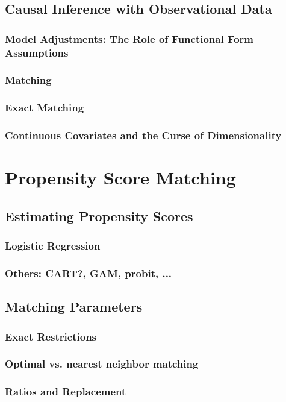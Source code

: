 \documentclass[11pt,titlepage]{article}
\begin{document}
\subsection{Causal Inference with Observational Data}
\subsubsection{Model Adjustments: The Role of Functional Form Assumptions}
\subsubsection{Matching}
\subsubsection{Exact Matching}
\subsubsection{Continuous Covariates and the Curse of Dimensionality}
\section{Propensity Score Matching}
\subsection{Estimating Propensity Scores}
\subsubsection{Logistic Regression}
\subsubsection{Others: CART?, GAM, probit, ...}
\subsection{Matching Parameters}
\subsubsection{Exact Restrictions}
\subsubsection{Optimal vs. nearest neighbor matching}
\subsubsection{Ratios and Replacement}
\end{document}
